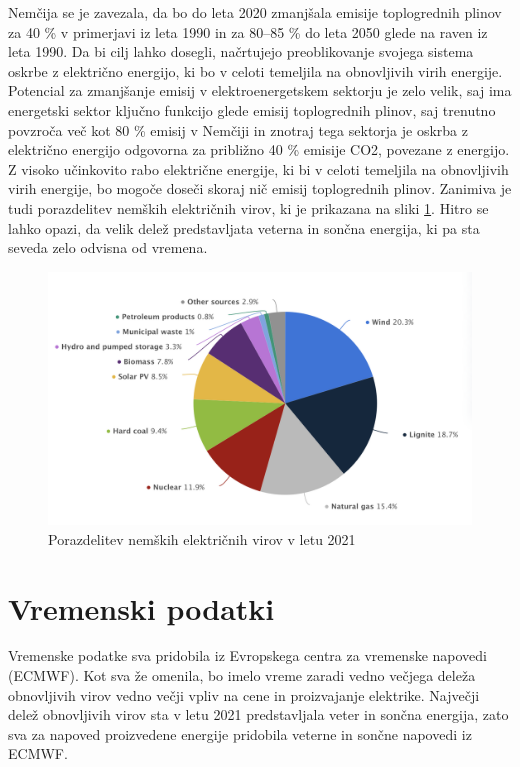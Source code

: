 \documentclass[12pt,a4paper]{amsart}
\theoremstyle{definition} %
\theoremstyle{plain} %
\begin{document}
Nemčija se je zavezala, da bo do leta 2020 zmanjšala emisije toplogrednih plinov za 40 \% v primerjavi iz leta 1990 in za 80–85 \% do leta 2050 glede na raven iz leta 1990. Da bi cilj lahko dosegli, načrtujejo preoblikovanje svojega sistema oskrbe z električno energijo, ki bo v celoti temeljila na obnovljivih virih energije. 
Potencial za zmanjšanje emisij v elektroenergetskem sektorju je zelo velik, saj ima energetski sektor ključno funkcijo glede emisij toplogrednih plinov, saj trenutno povzroča več kot 80 \% emisij v Nemčiji in znotraj tega sektorja je oskrba z električno energijo odgovorna za približno 40 \% emisije CO2, povezane z energijo. 
Z visoko učinkovito rabo električne energije, ki bi v celoti temeljila na obnovljivih virih energije, bo mogoče doseči skoraj nič emisij toplogrednih plinov.
Zanimiva je tudi porazdelitev nemških električnih virov, ki je prikazana na sliki \ref{fig:distribution}. Hitro se lahko opazi, da velik delež predstavljata veterna in sončna energija, ki pa sta seveda zelo odvisna od vremena.

\begin{figure}[h]
    \centering
    \includegraphics[scale=0.5]{porazdelitev_germany_2021.png}
    \caption{Porazdelitev nemških električnih virov v letu 2021}
    \label{fig:distribution}
\end{figure}


\section{Vremenski podatki}

Vremenske podatke sva pridobila iz Evropskega centra za vremenske napovedi (ECMWF). Kot sva že omenila, bo imelo vreme zaradi vedno večjega deleža obnovljivih virov vedno večji vpliv na cene in proizvajanje elektrike. 
Največji delež obnovljivih virov sta v letu 2021 predstavljala veter in sončna energija, zato sva za napoved proizvedene energije pridobila veterne in sončne napovedi iz ECMWF. 
\end{document}
